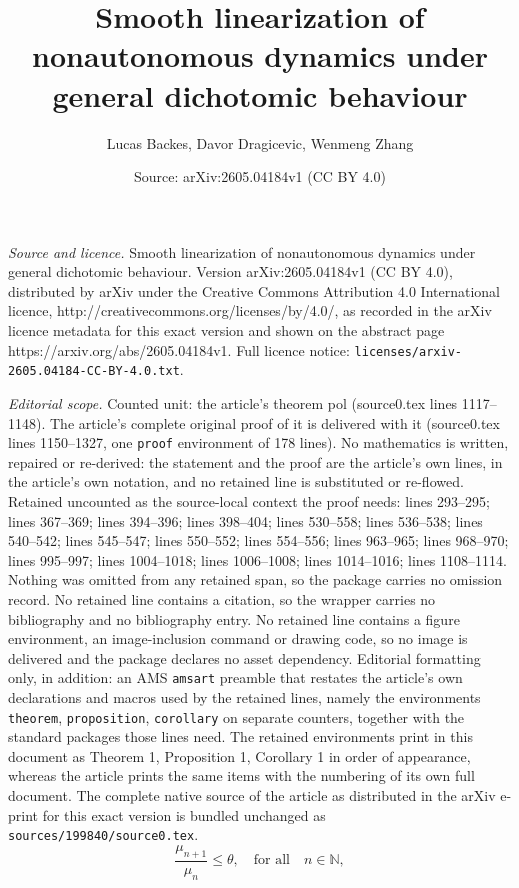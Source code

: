 \documentclass[10pt,a4paper]{amsart}
\title{Smooth linearization of nonautonomous dynamics under general dichotomic behaviour}
\author{Lucas Backes, Davor Dragicevic, Wenmeng Zhang}
\date{Source: arXiv:2605.04184v1 (CC BY 4.0)}
\def\N{\mathbb{N}}
\begin{document}
\maketitle

\noindent\emph{Source and licence.} Smooth linearization of nonautonomous dynamics under general dichotomic behaviour. Version arXiv:2605.04184v1 (CC BY 4.0), distributed by arXiv under the Creative Commons Attribution 4.0 International licence, http://creativecommons.org/licenses/by/4.0/, as recorded in the arXiv licence metadata for this exact version and shown on the abstract page https://arxiv.org/abs/2605.04184v1. Full licence notice: \texttt{licenses/arxiv-2605.04184-CC-BY-4.0.txt}.\par\smallskip

\noindent\textit{Editorial scope.} Counted unit: the article's theorem pol (source0.tex lines 1117--1148). The article's complete original proof of it is delivered with it (source0.tex lines 1150--1327, one \texttt{proof} environment of 178 lines). No mathematics is written, repaired or re-derived: the statement and the proof are the article's own lines, in the article's own notation, and no retained line is substituted or re-flowed.  Retained uncounted as the source-local context the proof needs: lines 293--295; lines 367--369; lines 394--396; lines 398--404; lines 530--558; lines 536--538; lines 540--542; lines 545--547; lines 550--552; lines 554--556; lines 963--965; lines 968--970; lines 995--997; lines 1004--1018; lines 1006--1008; lines 1014--1016; lines 1108--1114.  Nothing was omitted from any retained span, so the package carries no omission record.  No retained line contains a citation, so the wrapper carries no bibliography and no bibliography entry.  No retained line contains a figure environment, an image-inclusion command or drawing code, so no image is delivered and the package declares no asset dependency.  Editorial formatting only, in addition: an AMS \texttt{amsart} preamble that restates the article's own declarations and macros used by the retained lines, namely the environments \texttt{theorem}, \texttt{proposition}, \texttt{corollary} on separate counters, together with the standard packages those lines need.  The retained environments print in this document as Theorem 1, Proposition 1, Corollary 1 in order of appearance, whereas the article prints the same items with the numbering of its own full document.  The complete native source of the article as distributed in the arXiv e-print for this exact version is bundled unchanged as \texttt{sources/199840/source0.tex}.
\begin{equation}\label{eq: grbound}
	\frac{\mu_{n+1}}{\mu_n}\le \theta, \quad \text{for all} \quad n \in \N,
\end{equation} 
\end{document}
